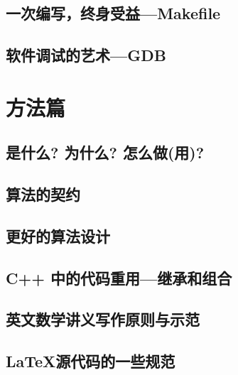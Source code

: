 \documentclass[a4paper,oneside]{report}
\begin{document}
\begin{CJK*}{UTF8}{gkai}
\section{一次编写，终身受益---Makefile}
\label{sec:make}


\section{软件调试的艺术---GDB}
\label{sec:gdb}




\chapter{方法篇}

\section{是什么? 为什么? 怎么做(用)?}
\label{sec:WhatWhyHow}


\section{算法的契约}
\label{sec:contract}


\section{更好的算法设计}
\label{sec:designAlgo}


\section{C++ 中的代码重用---继承和组合}
\label{sec:reuse}


\section{英文数学讲义写作原则与示范}
\label{sec:writeNotes}


\section{\LaTeX 源代码的一些规范}
\label{sec:writeTexfiles}

{\footnotesize


}



\end{CJK*}
\end{document}
